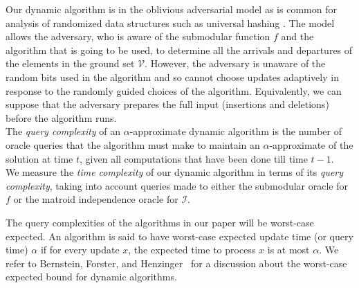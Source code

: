 \documentclass[11pt]{article}
\newcommand{\mI}{{\mathcal{I}}}
\newcommand{\ground}{\ensuremath{\mathcal{V}}}
\begin{document}
Our dynamic algorithm is in the oblivious adversarial model as is common for analysis of randomized data structures such as universal hashing \cite{DBLP:conf/stoc/CarterW77}. 
The model allows the adversary, who is aware of the submodular function $f$ and the algorithm that is going to be used, to determine all the arrivals and departures of the elements in the ground set $\ground$.
However, the adversary is unaware of the random bits used in the algorithm and so cannot choose updates adaptively in response to the randomly guided choices of the algorithm. Equivalently, we can suppose that the adversary prepares the full input (insertions and deletions) before the algorithm runs. \\
The \emph{query complexity} of an $\alpha$-approximate dynamic algorithm is the number of oracle queries that the algorithm must make to 
maintain an $\alpha$-approximate of the solution at time $t$, given all computations that have been done 
till time $t-1$.\\
We measure the \emph{time complexity} of our dynamic algorithm 
in terms of its \emph{query complexity}, taking into account queries made to either the submodular oracle for $f$ or the matroid independence oracle for $\mI$. 

The query complexities of the algorithms in our paper will be worst-case expected.
An algorithm is said to have worst-case expected update time (or query time) $\alpha$ 
if for every update $x$, the expected time to process $x$ is at most $\alpha$. 
We refer to Bernstein, Forster, and Henzinger~\cite{DBLP:journals/talg/BernsteinFH21} 
for a discussion about the worst-case expected bound for dynamic algorithms.
\end{document}
